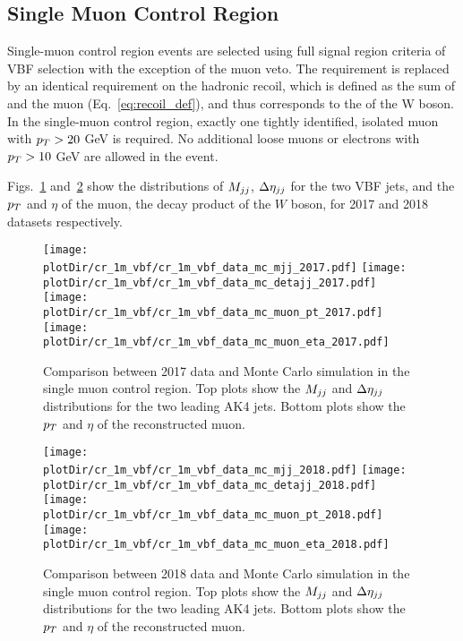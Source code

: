 \clearpage

\subsection{Single Muon Control Region}
\label{sec:selection_cr_1m}

Single-muon control region events are selected using full signal region criteria of VBF selection with the exception of the muon veto. 
The \ptmiss requirement is replaced by an identical requirement on the hadronic recoil, which is defined as the sum of \ptvecmiss and the muon \vpt (Eq.~\ref{eq:recoil_def}), 
and thus corresponds to the \pt of the W boson.
In the single-muon control region, exactly one tightly identified, isolated muon with $p_T > 20$ GeV is required. 
No additional loose muons or electrons with $p_T > 10$ GeV are allowed in the event.

Figs.~\ref{fig:cr_1m_vbf_2017_mtr} and~\ref{fig:cr_1m_vbf_2018_mtr} show the distributions of $M_{jj}$, $\Delta \eta_{jj}$ for the two VBF jets,
and the $p_T$ and $\eta$ of the muon, the decay product of the $W$ boson, for 2017 and 2018 datasets respectively.

\begin{figure}[htbp]
    \begin{center}
        \texttt{[image: \\plotDir/cr\_1m\_vbf/cr\_1m\_vbf\_data\_mc\_mjj\_2017.pdf]}
        \texttt{[image: \\plotDir/cr\_1m\_vbf/cr\_1m\_vbf\_data\_mc\_detajj\_2017.pdf]} \\
        \texttt{[image: \\plotDir/cr\_1m\_vbf/cr\_1m\_vbf\_data\_mc\_muon\_pt\_2017.pdf]}
        \texttt{[image: \\plotDir/cr\_1m\_vbf/cr\_1m\_vbf\_data\_mc\_muon\_eta\_2017.pdf]}
    \end{center}
    \caption{Comparison between 2017 data and Monte Carlo simulation in the single muon control region. Top plots
        show the $M_{jj}$ and $\Delta \eta_{jj}$ distributions for the two leading AK4 jets. Bottom plots show the $p_T$ and $\eta$
        of the reconstructed muon.}
    \label{fig:cr_1m_vbf_2017_mtr}
\end{figure}

\begin{figure}[htbp]
    \begin{center}
        \texttt{[image: \\plotDir/cr\_1m\_vbf/cr\_1m\_vbf\_data\_mc\_mjj\_2018.pdf]}
        \texttt{[image: \\plotDir/cr\_1m\_vbf/cr\_1m\_vbf\_data\_mc\_detajj\_2018.pdf]} \\
        \texttt{[image: \\plotDir/cr\_1m\_vbf/cr\_1m\_vbf\_data\_mc\_muon\_pt\_2018.pdf]}
        \texttt{[image: \\plotDir/cr\_1m\_vbf/cr\_1m\_vbf\_data\_mc\_muon\_eta\_2018.pdf]}
    \end{center}
    \caption{Comparison between 2018 data and Monte Carlo simulation in the single muon control region. Top plots
    show the $M_{jj}$ and $\Delta \eta_{jj}$ distributions for the two leading AK4 jets. Bottom plots show the $p_T$ and $\eta$
    of the reconstructed muon.}
    \label{fig:cr_1m_vbf_2018_mtr}
\end{figure}

